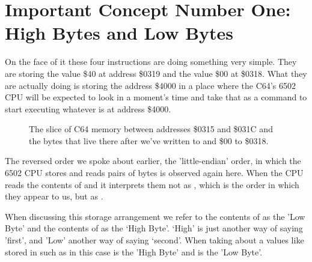 \section{Important Concept Number One: High Bytes and Low Bytes}
On the face of it these four instructions are doing something very simple. They are storing the value \$40
at address \$0319 and the value \$00 at \$0318. What they are actually doing is storing the address \$4000
in a place where the C64's 6502 CPU will be expected to look in a moment's time and take that as a command
to start executing whatever is at address \$4000.


\begin{figure}[H]
  {
    \setlength{\tabcolsep}{3.0pt}
    \setlength\cmidrulewidth{\heavyrulewidth} %
    \begin{adjustbox}{width=7cm,center}
    \end{adjustbox}
  }\caption{The slice of C64 memory between addresses \$0315 and \$031C and the bytes that live there after we've
written  to  and \$00 to \$0318.}
\end{figure}

The reversed order we spoke about earlier, the 'little-endian' order, in which the 6502 CPU stores and reads
pairs of bytes is observed again here. When the CPU reads the contents of  and 
it interprets them not as , which is the order in which they appear to us, but as .

When discussing this storage arrangement we refer to the contents of  as the 'Low Byte' and the
contents of  as the `High Byte'. `High' is just another way of saying 'first', and 'Low' another
way of saying `second'. When taking about a values like  stored in  such as in this case  is the
'High Byte' and  is the 'Low Byte'.

